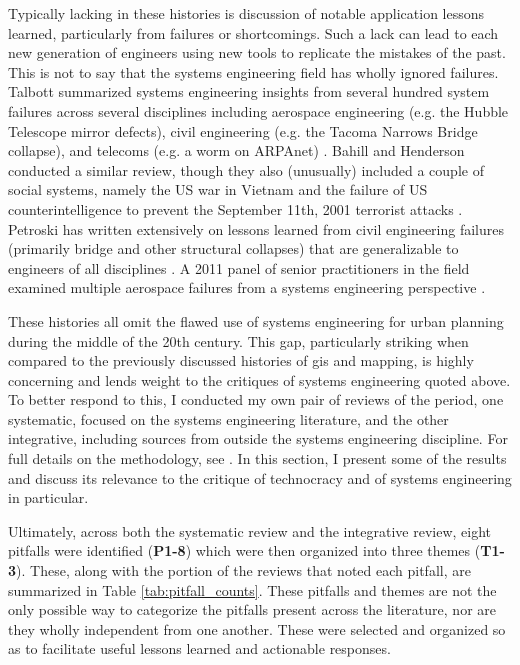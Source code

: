Typically lacking in these histories is discussion of notable application lessons learned, particularly from failures or shortcomings. Such a lack can lead to each new generation of engineers using new tools to replicate the mistakes of the past. This is not to say that the systems engineering field has wholly ignored failures. Talbott summarized systems engineering insights from several hundred system failures across several disciplines including aerospace engineering (e.g. the Hubble Telescope mirror defects), civil engineering (e.g. the Tacoma Narrows Bridge collapse), and telecoms (e.g. a worm on ARPAnet) \cite{talbottWhySystemsFail1993}. Bahill and Henderson conducted a similar review, though they also (unusually) included a couple of social systems, namely the US war in Vietnam and the failure of US counterintelligence to prevent the September 11th, 2001 terrorist attacks \cite{terrybahillRequirementsDevelopmentVerification2005}. Petroski has written extensively on lessons learned from civil engineering failures (primarily bridge and other structural collapses) that are generalizable to engineers of all disciplines \cite{petroskiEngineerHumanRole1992, petroskiDesignParadigmsCase1994}. A 2011 panel of senior practitioners in the field examined multiple aerospace failures from a systems engineering perspective \cite{slegersLearningFailureSystems2012}. 

These histories all omit the flawed use of systems engineering for urban planning during the middle of the 20th century. This gap, particularly striking when compared to the previously discussed histories of \ac{gis} and mapping, is highly concerning and lends weight to the critiques of systems engineering quoted above. To better respond to this, I conducted my own pair of reviews of the period, one systematic, focused on the systems engineering literature, and the other integrative, including sources from outside the systems engineering discipline. For full details on the methodology, see  \cite{reidSystemsEngineeringAppliedPendingPublication}. In this section, I present some of the results and discuss its relevance to the critique of technocracy and of systems engineering in particular.

Ultimately, across both the systematic review and the integrative review, eight pitfalls were identified (\textbf{P1-8}) which were then organized into three themes (\textbf{T1-3}). These, along with the portion of the reviews that noted each pitfall, are summarized in Table \ref{tab:pitfall_counts}. These pitfalls and themes are not the only possible way to categorize the pitfalls present across the literature, nor are they wholly independent from one another. These were selected and organized so as to facilitate useful lessons learned and actionable responses.

